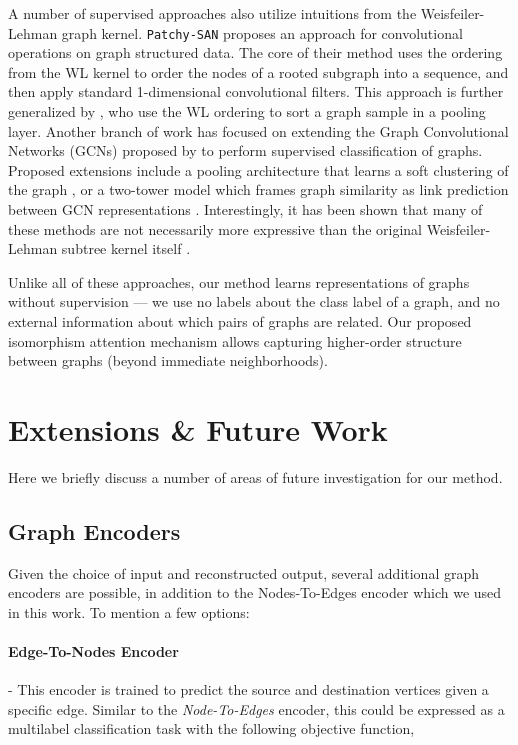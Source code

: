 \documentclass[sigconf]{acmart}
\begin{document}
A number of supervised approaches also utilize intuitions from the Weisfeiler-Lehman graph kernel.
\texttt{Patchy-SAN} \citep{niepert2016learning} proposes an approach for convolutional operations on graph structured data.  The core of their method uses the ordering from the WL kernel to order the nodes of a rooted subgraph into a sequence, and then apply standard 1-dimensional convolutional filters.
This approach is further generalized by \citep{zhang2018end}, who use the WL ordering to sort a graph sample in a pooling layer.
Another branch of work has focused on extending the Graph Convolutional Networks (GCNs) proposed by \cite{kipf-gcn} to perform supervised classification of graphs.
Proposed extensions include a pooling architecture that learns a soft clustering of the graph \citep{ying2018hierarchical}, or a two-tower model which frames graph similarity as link prediction between GCN representations \cite{bai2018graph}.
Interestingly, it has been shown that many of these methods are not necessarily more expressive than the original Weisfeiler-Lehman subtree kernel itself \cite{morris2018weisfeiler}.

Unlike all of these approaches, our method learns representations of graphs without supervision --- we use no labels about the class label of a graph, and no external information about which pairs of graphs are related.
Our proposed isomorphism attention mechanism allows capturing higher-order structure between graphs (beyond immediate neighborhoods).




\section{Extensions \& Future Work}
\label{sec:extensions}
Here we briefly discuss a number of areas of future investigation for our method.

\subsection{Graph Encoders}
Given the choice of input and reconstructed output, several additional graph encoders are possible, in addition to the Nodes-To-Edges encoder which we used in this work.  To mention a few options:

\paragraph{Edge-To-Nodes Encoder} -
This encoder is trained to predict the source and destination vertices given a specific edge.
Similar to the \emph{Node-To-Edges} encoder, this could be expressed as a multilabel classification task with the following objective function,
\end{document}
